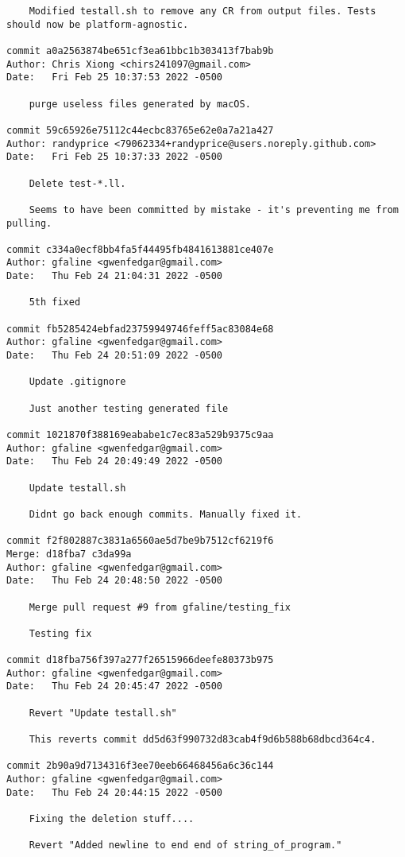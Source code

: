 {\begin{verbatim}
    Modified testall.sh to remove any CR from output files. Tests should now be platform-agnostic.

commit a0a2563874be651cf3ea61bbc1b303413f7bab9b
Author: Chris Xiong <chirs241097@gmail.com>
Date:   Fri Feb 25 10:37:53 2022 -0500

    purge useless files generated by macOS.

commit 59c65926e75112c44ecbc83765e62e0a7a21a427
Author: randyprice <79062334+randyprice@users.noreply.github.com>
Date:   Fri Feb 25 10:37:33 2022 -0500

    Delete test-*.ll.
    
    Seems to have been committed by mistake - it's preventing me from pulling.

commit c334a0ecf8bb4fa5f44495fb4841613881ce407e
Author: gfaline <gwenfedgar@gmail.com>
Date:   Thu Feb 24 21:04:31 2022 -0500

    5th fixed

commit fb5285424ebfad23759949746feff5ac83084e68
Author: gfaline <gwenfedgar@gmail.com>
Date:   Thu Feb 24 20:51:09 2022 -0500

    Update .gitignore
    
    Just another testing generated file

commit 1021870f388169eababe1c7ec83a529b9375c9aa
Author: gfaline <gwenfedgar@gmail.com>
Date:   Thu Feb 24 20:49:49 2022 -0500

    Update testall.sh
    
    Didnt go back enough commits. Manually fixed it.

commit f2f802887c3831a6560ae5d7be9b7512cf6219f6
Merge: d18fba7 c3da99a
Author: gfaline <gwenfedgar@gmail.com>
Date:   Thu Feb 24 20:48:50 2022 -0500

    Merge pull request #9 from gfaline/testing_fix
    
    Testing fix

commit d18fba756f397a277f26515966deefe80373b975
Author: gfaline <gwenfedgar@gmail.com>
Date:   Thu Feb 24 20:45:47 2022 -0500

    Revert "Update testall.sh"
    
    This reverts commit dd5d63f990732d83cab4f9d6b588b68dbcd364c4.

commit 2b90a9d7134316f3ee70eeb66468456a6c36c144
Author: gfaline <gwenfedgar@gmail.com>
Date:   Thu Feb 24 20:44:15 2022 -0500

    Fixing the deletion stuff....
    
    Revert "Added newline to end end of string_of_program."
    

\end{verbatim}}
